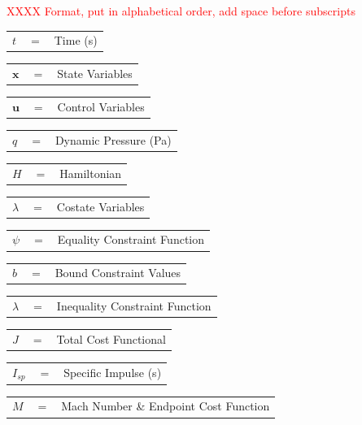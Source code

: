 \textcolor{red}{XXXX Format, put in alphabetical order, add space before subscripts}
\noindent
\begin{tabular}{p{0.8cm}p{0.8cm}p{5.6cm}}
	$t$ & $=$ & Time (s)\\
\end{tabular} 
\begin{tabular}{p{0.8cm}p{0.8cm}p{5.6cm}}
	$\textbf{x}$& $=$ & State Variables\\
\end{tabular} 
\begin{tabular}{p{0.8cm}p{0.8cm}p{5.6cm}}
	$\textbf{u}$& $=$ & Control Variables\\
\end{tabular} 
\begin{tabular}{p{0.8cm}p{0.8cm}p{5.6cm}}
	$q$ & $=$ & Dynamic Pressure (Pa)\\
\end{tabular} 
\begin{tabular}{p{0.8cm}p{0.8cm}p{5.6cm}}
	$H$ & $=$ & Hamiltonian\\
\end{tabular}
\begin{tabular}{p{0.8cm}p{0.8cm}p{5.6cm}}
	$\lambda$ & $=$ & Costate Variables\\
\end{tabular}
\begin{tabular}{p{0.8cm}p{0.8cm}p{5.6cm}}
	$\psi$ & $=$ & Equality Constraint Function\\
\end{tabular}
\begin{tabular}{p{0.8cm}p{0.8cm}p{5.6cm}}
	$b$ & $=$ & Bound Constraint Values\\
\end{tabular}
\begin{tabular}{p{0.8cm}p{0.8cm}p{5.6cm}}
	$\lambda$ & $=$ & Inequality Constraint Function\\
\end{tabular}
\begin{tabular}{p{0.8cm}p{0.8cm}p{5.6cm}}
	$J$ & $=$ & Total Cost Functional\\
\end{tabular}
\begin{tabular}{p{0.8cm}p{0.8cm}p{5.6cm}}
	$I_{sp}$ & $=$ & Specific Impulse (s)\\ 
\end{tabular} 
\begin{tabular}{p{0.8cm}p{0.8cm}p{5.6cm}}
	$M$ & $=$ & Mach Number \& Endpoint Cost Function\\
\end{tabular}
